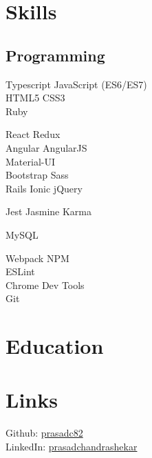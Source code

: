 \documentclass[]{my-resume-openfont}
\begin{document}
\begin{minipage}[t]{0.33\textwidth}


\section{Skills}
\subsection{Programming}

Typescript \textbullet{} JavaScript (ES6/ES7) \\
HTML5 \textbullet{} CSS3 \\
Ruby
\sectionsep

React \textbullet{} Redux \\
Angular \textbullet{} AngularJS \\
Material-UI \\
Bootstrap \textbullet{} Sass \\
Rails \textbullet{} Ionic \textbullet{} jQuery
\sectionsep

Jest \textbullet{} Jasmine \textbullet{} Karma
\sectionsep

MySQL
\sectionsep

Webpack \textbullet{} NPM \\
ESLint  \\
Chrome Dev Tools  \\
Git
\sectionsep



\section{Education}

\sectionsep


\section{Links}
Github: \href{https://github.com/prasadc82}{prasadc82} \\
LinkedIn: \href{https://www.linkedin.com/in/prasadchandrashekar}{prasadchandrashekar} \\
\sectionsep

%
%

\end{minipage}
\end{document}
